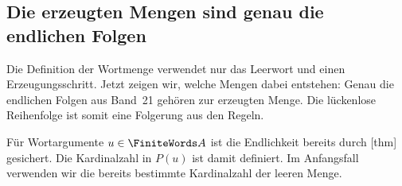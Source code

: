 \subsection{Die erzeugten Mengen sind genau die endlichen Folgen}

Die Definition der Wortmenge verwendet nur das Leerwort und einen
Erzeugungsschritt. Jetzt zeigen wir, welche Mengen dabei entstehen:
Genau die endlichen Folgen aus Band~21 gehören zur erzeugten Menge.
Die lückenlose Reihenfolge ist somit eine Folgerung aus den Regeln.

\noindent\begin{minipage}{\linewidth}
\end{minipage}\par
Für Wortargumente \(u\in\FiniteWords A\) ist die Endlichkeit bereits
durch [thm] gesichert.
Die Kardinalzahl in \(P(u)\) ist damit definiert. Im Anfangsfall verwenden
wir die bereits bestimmte Kardinalzahl der leeren Menge.
